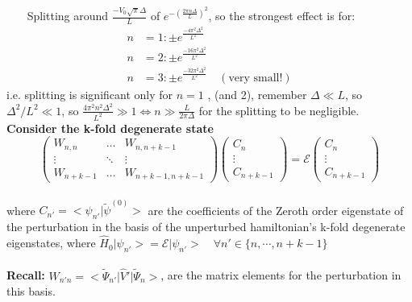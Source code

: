 \documentclass[12pt,fancychapters]{report}
\numberwithin{equation}{section}
\begin{document}
\
\
\
\noindent
Splitting around $ \frac{-V_0\sqrt{\pi}\Delta}{L} $ of
$ e^{-\left(\frac{2\pi n \Delta}{L}\right)^2} $, so the strongest effect is for:
\begin{align*}
  n &= 1: \pm e^{\frac{-4\pi^2\Delta^2}{L^2}}\\
  n &= 2:\pm e^{\frac{-16\pi^2\Delta^2}{L^2}}\\
  n &= 3: \pm e^{\frac{-32\pi^2\Delta^2}{L^2}}\quad (\text{very small!})
\end{align*}
i.e. splitting is significant only for $n=1$ , (and 2), remember  $\Delta\ll L$, so 
$\Delta^2/L^2 \ll 1$, so $\frac{4\pi^2 n^2 \Delta^2}{L^2}\gg 1 \Leftrightarrow n\gg\frac{L}
{2\pi\Delta}$ for the splitting to be negligible.
\noindent
\textbf{Consider the k-fold degenerate state}
\\
\begin{equation} 
  \begin{pmatrix} 
    W_{n,n} & \dots  &  W_{n,n+k-1}\\
    \vdots & \ddots & \vdots\\
    W_{n+k-1} & \dots  &  
    W_{n+k-1,n+k-1} 
    \end{pmatrix}
    \begin{pmatrix}
      C_n\\
      \vdots\\
      C_{n+k-1}
    \end{pmatrix}
    = \mathcal{E}
    \begin{pmatrix}
  C_n\\
      \vdots\\
      C_{n+k-1}
    \end{pmatrix}
  \end{equation}
  \\
  where $C_{n'} = \big<\psi_{n'}\big|\tilde{\psi}^{(0)} \big>$ are the coefficients  of the Zeroth
  order eigenstate of the perturbation in the basis of the unperturbed hamiltonian's k-fold degenerate
  eigenstates, where $\hat{H}_0\big|\psi_{n'}\big> = \mathcal{E}\big|\psi_{n'}\big>\quad \forall 
  n' \in \{n, \cdots, n+k-1 \}$\\
  \\
  \textbf{Recall:} $W_{n'n} = \big<\tilde{\Psi}_{n'}\big|\hat{V}'\big|\tilde{\Psi}_n \big>$, are
  the matrix elements for the perturbation in this basis.
\end{document}
